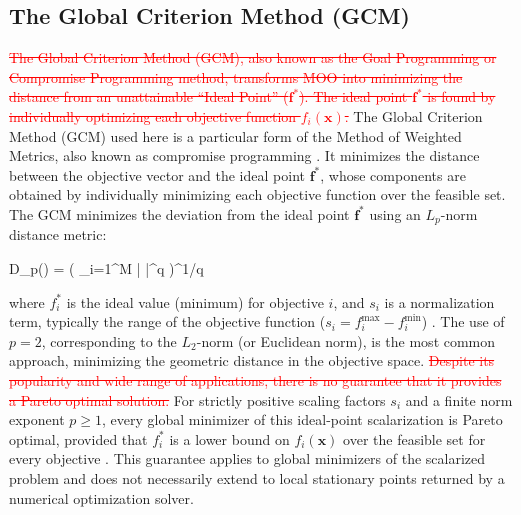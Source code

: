 \documentclass[11pt,pdflatex,sn-mathphys-ay]{sn-jnl}%
\theoremstyle{definition}
\theoremstyle{thmstyleone}%
\theoremstyle{thmstyletwo}%
\theoremstyle{thmstylethree}%
\newcommand{\del}[1]{\textcolor{red}{\sout{#1}}}
\newcommand{\add}[1]{\textcolor{revisionblue}{#1}}
\begin{document}
\begin{appendices}
		\subsection{The Global Criterion Method (GCM)}
		
		\del{The Global Criterion Method (GCM), also known as the
			Goal Programming or Compromise Programming method,
			transforms MOO into minimizing the distance from an
			unattainable ``Ideal Point'' ($\bm{f}^*$).
			The ideal point $\bm{f}^*$ is found by individually
			optimizing each objective function $f_i(\bm{x})$.}
		\add{The Global Criterion Method (GCM) used here is
			a particular form of the Method of Weighted Metrics,
			also known as compromise programming
			\cite{miettinen1999nonlinear}.
			It minimizes the distance between the objective
			vector and the ideal point $\bm{f}^*$, whose
			components are obtained by individually minimizing
			each objective function over the feasible set.}
		The GCM minimizes the deviation from the ideal point $\bm{f}^*$ using an $L_p$-norm distance metric:
		\begin{mini!}{ \in \Omega}{D_p() = \left( \sum_{i=1}^{M} \left|  \right|^q \right)^{1/q}}{}{}
		\end{mini!}
		where $f_i^*$ is the ideal value (minimum) for objective $i$, and $s_i$ is a normalization term, typically the range of the objective function ($s_i = f_i^{\max} - f_i^{\min}$) \cite{marler2004survey}. The use of $p=2$, corresponding to the $L_2$-norm (or Euclidean norm), is the most common approach, minimizing the geometric distance in the objective space. 
		\del{Despite its popularity and wide range
			of applications, there is no guarantee
			that it provides a Pareto optimal solution.}
		\add{For strictly positive scaling factors $s_i$ and a
			finite norm exponent $p\geq 1$, every global minimizer
			of this ideal-point scalarization is Pareto optimal,
			provided that $f_i^*$ is a lower bound on $f_i(\bm{x})$
			over the feasible set for every objective
			\cite{miettinen1999nonlinear}.
			This guarantee applies to global minimizers of the
			scalarized problem and does not necessarily extend
			to local stationary points returned by a numerical
			optimization solver.}
		

\end{appendices}
\end{document}
